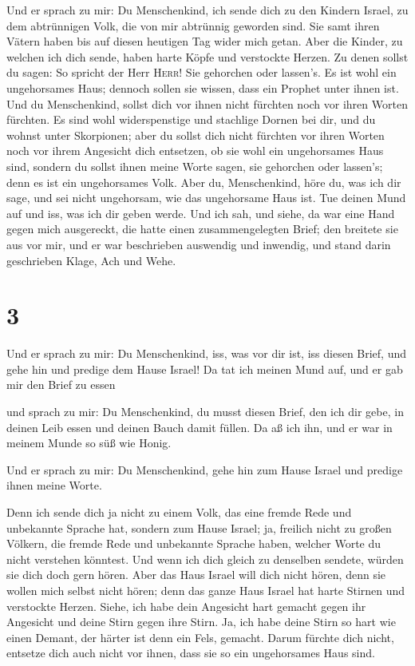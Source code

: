  Und er sprach zu mir: Du Menschenkind, ich sende dich zu
den Kindern Israel, zu dem abtrünnigen Volk, die von mir abtrünnig
geworden sind. Sie samt ihren Vätern haben bis auf diesen heutigen Tag
wider mich getan.  Aber die Kinder, zu welchen ich dich
sende, haben harte Köpfe und verstockte Herzen. Zu denen sollst du
sagen: So spricht der Herr \textsc{Herr}!  Sie gehorchen
oder lassen's. Es ist wohl ein ungehorsames Haus; dennoch sollen sie
wissen, dass ein Prophet unter ihnen ist.  Und du
Menschenkind, sollst dich vor ihnen nicht fürchten noch vor ihren Worten
fürchten. Es sind wohl widerspenstige und stachlige Dornen bei dir, und
du wohnst unter Skorpionen; aber du sollst dich nicht fürchten vor ihren
Worten noch vor ihrem Angesicht dich entsetzen, ob sie wohl ein
ungehorsames Haus sind,  sondern du sollst ihnen meine
Worte sagen, sie gehorchen oder lassen's; denn es ist ein ungehorsames
Volk.  Aber du, Menschenkind, höre du, was ich dir sage,
und sei nicht ungehorsam, wie das ungehorsame Haus ist. Tue deinen Mund
auf und iss, was ich dir geben werde.  Und ich sah, und
siehe, da war eine Hand gegen mich ausgereckt, die hatte einen
zusammengelegten Brief;  den breitete sie aus vor mir,
und er war beschrieben auswendig und inwendig, und stand darin
geschrieben Klage, Ach und Wehe.

\hypertarget{section-2}{%
\section{3}\label{section-2}}

 Und er sprach zu mir: Du Menschenkind, iss, was vor dir
ist, iss diesen Brief, und gehe hin und predige dem Hause Israel!
 Da tat ich meinen Mund auf, und er gab mir den Brief zu
essen

 und sprach zu mir: Du Menschenkind, du musst diesen
Brief, den ich dir gebe, in deinen Leib essen und deinen Bauch damit
füllen. Da aß ich ihn, und er war in meinem Munde so süß wie Honig.

 Und er sprach zu mir: Du Menschenkind, gehe hin zum Hause
Israel und predige ihnen meine Worte.

 Denn ich sende dich ja nicht zu einem Volk, das eine
fremde Rede und unbekannte Sprache hat, sondern zum Hause Israel;
 ja, freilich nicht zu großen Völkern, die fremde Rede und
unbekannte Sprache haben, welcher Worte du nicht verstehen könntest. Und
wenn ich dich gleich zu denselben sendete, würden sie dich doch gern
hören.  Aber das Haus Israel will dich nicht hören, denn
sie wollen mich selbst nicht hören; denn das ganze Haus Israel hat harte
Stirnen und verstockte Herzen.  Siehe, ich habe dein
Angesicht hart gemacht gegen ihr Angesicht und deine Stirn gegen ihre
Stirn.  Ja, ich habe deine Stirn so hart wie einen Demant,
der härter ist denn ein Fels, gemacht. Darum fürchte dich nicht,
entsetze dich auch nicht vor ihnen, dass sie so ein ungehorsames Haus
sind.

